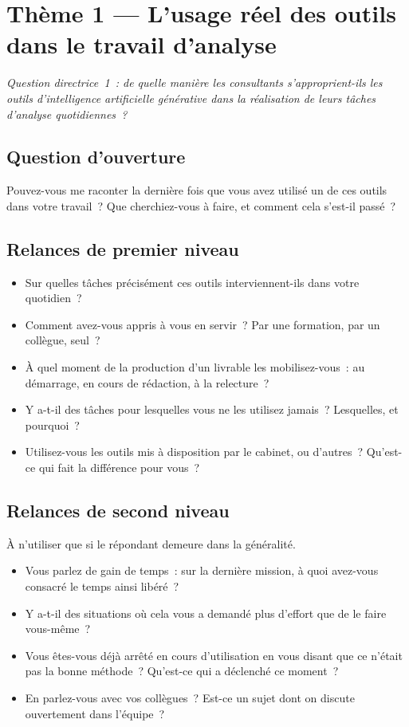 \section{Thème 1 --- L'usage réel des outils dans le travail d'analyse}

\textit{Question directrice~1~: de quelle manière les consultants s'approprient-ils
les outils d'intelligence artificielle générative dans la réalisation de leurs tâches
d'analyse quotidiennes~?}

\subsection*{Question d'ouverture}

Pouvez-vous me raconter la dernière fois que vous avez utilisé un de ces outils dans
votre travail~? Que cherchiez-vous à faire, et comment cela s'est-il passé~?

\subsection*{Relances de premier niveau}

\begin{itemize}
    \item Sur quelles tâches précisément ces outils interviennent-ils dans votre
    quotidien~?
    \item Comment avez-vous appris à vous en servir~? Par une formation, par un
    collègue, seul~?
    \item À quel moment de la production d'un livrable les mobilisez-vous~: au
    démarrage, en cours de rédaction, à la relecture~?
    \item Y a-t-il des tâches pour lesquelles vous ne les utilisez jamais~? Lesquelles,
    et pourquoi~?
    \item Utilisez-vous les outils mis à disposition par le cabinet, ou d'autres~?
    Qu'est-ce qui fait la différence pour vous~?
\end{itemize}

\subsection*{Relances de second niveau}

À n'utiliser que si le répondant demeure dans la généralité.

\begin{itemize}
    \item Vous parlez de gain de temps~: sur la dernière mission, à quoi avez-vous
    consacré le temps ainsi libéré~?
    \item Y a-t-il des situations où cela vous a demandé plus d'effort que de le faire
    vous-même~?
    \item Vous êtes-vous déjà arrêté en cours d'utilisation en vous disant que ce
    n'était pas la bonne méthode~? Qu'est-ce qui a déclenché ce moment~?
    \item En parlez-vous avec vos collègues~? Est-ce un sujet dont on discute
    ouvertement dans l'équipe~?
\end{itemize}

